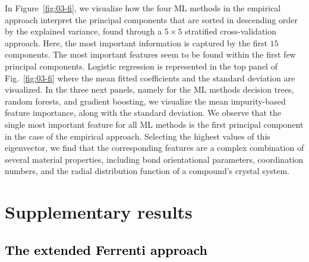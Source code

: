 \documentclass[superscriptaddress,unsortedaddress,
 amsmath,amssymb,
 aps,
]{revtex4-2}
\newcommand{\mrk}[1]{\textcolor{black}{#1}}
\begin{document}
In Figure~\ref{fig:03-fi}, we visualize how the four  ML methods in the empirical approach interpret the principal components that are sorted in descending order by the explained variance, found through a $5\times 5$ stratified cross-validation approach.  
Here, the most important information is captured by the first $15$ components. The most important features seem to be found within the first few principal  components. 
Logistic regression is represented in the top panel of Fig.~\ref{fig:03-fi} where the mean fitted coefficients and the standard deviation are visualized. In the three next panels, namely for the ML methods decision trees, random forests, and gradient boosting, we visualize the mean impurity-based feature importance, along with the standard deviation. We observe that the single most important feature for all ML methods is the first principal component in the case of the empirical approach. Selecting the highest values of this eigenvector, we find that the corresponding features are a complex combination of several material properties, including bond orientational parameters, coordination numbers, and the radial distribution function of a compound's crystal system. 




\section*{Supplementary results} 

\subsection*{\mrk{The extended Ferrenti approach}}
\end{document}
